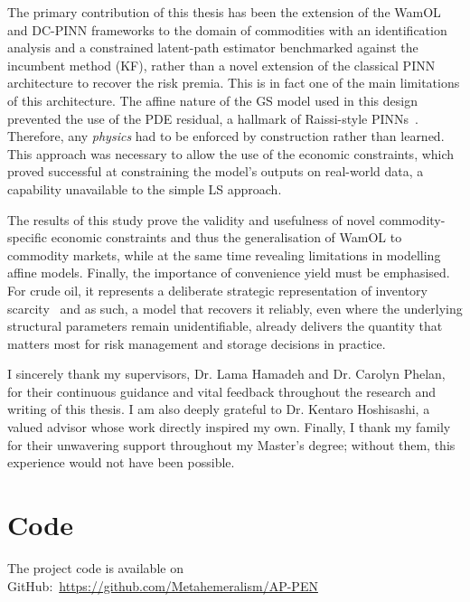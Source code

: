 \documentclass[sigconf, authorversion=true, nonacm=true]{acmart}
\begin{document}
The primary contribution of this thesis has been the extension of the WamOL and DC-PINN frameworks to the domain of commodities with an identification analysis and a constrained latent-path estimator benchmarked against the incumbent method (KF), rather than a novel extension of the classical PINN architecture to recover the risk premia. This is in fact one of the main limitations of this architecture. The affine nature of the GS model used in this design prevented the use of the PDE residual, a hallmark of Raissi-style PINNs~\cite{Raissi2019Physics-informedEquations}. Therefore, any \textit{physics} had to be enforced by construction rather than learned. This approach was necessary to allow the use of the economic constraints, which proved successful at constraining the model's outputs on real-world data, a capability unavailable to the simple LS approach.

The results of this study prove the validity and usefulness of novel commodity-specific economic constraints and thus the generalisation of WamOL to commodity markets, while at the same time revealing limitations in modelling affine models. Finally, the importance of convenience yield must be emphasised. For crude oil, it represents a deliberate strategic representation of inventory scarcity~\cite{Gibson1990StochasticClaims} and as such, a model that recovers it reliably, even where the underlying structural parameters remain unidentifiable, already delivers the quantity that matters most for risk management and storage decisions in practice.

\begin{acks}
I sincerely thank my supervisors, Dr. Lama Hamadeh and Dr. Carolyn Phelan, for their continuous guidance and vital feedback throughout the research and writing of this thesis. I am also deeply grateful to Dr. Kentaro Hoshisashi, a valued advisor whose work directly inspired my own. Finally, I thank my family for their unwavering support throughout my Master's degree; without them, this experience would not have been possible.
\end{acks}





\appendix

\section{Code}
The project code is available on GitHub:~\url{https://github.com/Metahemeralism/AP-PEN}
\end{document}
